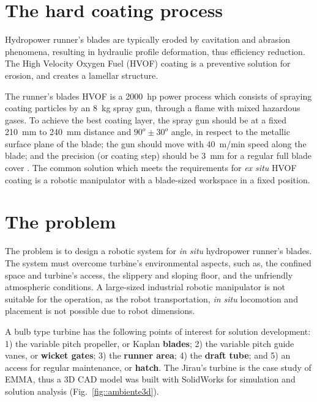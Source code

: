 \section{The hard coating process}\label{hvof}

Hydropower runner's blades are typically eroded by cavitation and abrasion
phenomena, resulting in hydraulic profile deformation, thus efficiency
reduction. The High Velocity Oxygen Fuel (HVOF) coating is a preventive
solution for erosion, and creates a lamellar structure. 

The runner's blades HVOF is a 2000~hp power process which consists of
spraying coating particles by an 8~kg spray gun, through a flame with mixed
hazardous gases. To achieve the best coating layer, the spray gun should be at
a fixed 210~mm to 240~mm distance and $90^o \pm 30^o$ angle, in respect to the
metallic surface plane of the blade; the gun should move with 40~m/min speed
along the blade; and the precision (or coating step) should be 3~mm for a
regular full blade cover \cite{li2002effect}. The
common solution which meets the requirements for \textit{ex situ} HVOF coating
is a robotic manipulator with a blade-sized workspace in a fixed position.

\section{The problem}\label{problem}

The problem is to design a robotic system for \textit{in situ}
hydropower runner's blades. The system must overcome turbine's environmental
aspects, such as, the confined space and turbine's access, the slippery and
sloping floor, and the unfriendly atmospheric conditions. A large-sized industrial
robotic manipulator is not suitable for the operation, as the robot
transportation, \textit{in situ} locomotion and placement is not possible due
to robot dimensions.

A bulb type turbine has the following points of interest for solution
development: 1) the variable pitch propeller, or Kaplan \textbf{blades}; 2) the
variable pitch guide vanes, or \textbf{wicket gates}; 3) the \textbf{runner
area}; 4) the \textbf{draft tube}; and 5) an access for regular
maintenance, or \textbf{hatch}. The Jirau's turbine is the case study of EMMA,
thus a 3D CAD model was built with SolidWorks\raisebox{1ex}{\textregistered}
for simulation and solution analysis (Fig.~\ref{fig::ambiente3d}).

